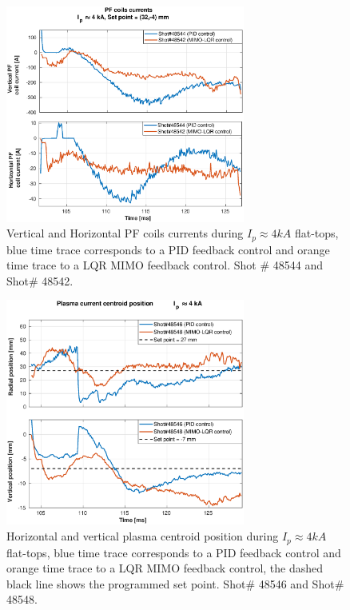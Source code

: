 \begin{figure}
	\centering
	\includegraphics[width=0.7\textwidth]{Chp5/PIDvsMIMO_544_542_curr_2.eps}
	\caption{   Vertical and Horizontal PF coils currents during  $I_p\approx 4kA$  flat-tops, blue time trace corresponds to a PID feedback control and orange time trace to a LQR MIMO feedback control. Shot $\#$ 48544 and Shot$\#$ 48542.}
\end{figure}

\begin{figure}
	\centering
	\includegraphics[width=0.7\textwidth]{Chp5/PIDvsMIMO_546_548_2.eps}
	\caption{Horizontal and vertical plasma centroid position during  $I_p\approx 4kA$  flat-tops, blue time trace corresponds to a PID feedback control and orange time trace to a LQR MIMO feedback control, the dashed black line shows the programmed set point.  Shot$ \# $ 48546 and Shot$ \#  $48548.}
\end{figure}


